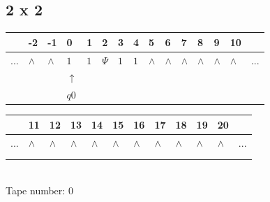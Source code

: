 \documentclass[11pt]{article}
\begin{document}
\pagebreak
\subsection{2 x 2}
\begin{table}[H]
\centering
\begin{tabular}{lllllllllllllll}
 & -2 & -1 & 0 & 1 & 2 & 3 & 4 & 5 & 6 & 7 & 8 & 9 & 10 & \\
\hline
$...$ & \multicolumn{1}{|l|}{$\wedge$} & \multicolumn{1}{|l|}{$\wedge$} & \multicolumn{1}{|l|}{$1$} & \multicolumn{1}{|l|}{$1$} & \multicolumn{1}{|l|}{$\Psi$} & \multicolumn{1}{|l|}{$1$} & \multicolumn{1}{|l|}{$1$} & \multicolumn{1}{|l|}{$\wedge$} & \multicolumn{1}{|l|}{$\wedge$} & \multicolumn{1}{|l|}{$\wedge$} & \multicolumn{1}{|l|}{$\wedge$} & \multicolumn{1}{|l|}{$\wedge$} & \multicolumn{1}{|l|}{$\wedge$} & $...$\\
\hline
&  &  & $\uparrow$ &  &  &  &  &  &  &  &  &  &  &  \\
&  &  & $ q0 $ &  &  &  &  &  &  &  &  &  &  &  \\
\end{tabular}
\begin{tabular}{llllllllllll}
 & 11 & 12 & 13 & 14 & 15 & 16 & 17 & 18 & 19 & 20 & \\
\hline
$...$ & \multicolumn{1}{|l|}{$\wedge$} & \multicolumn{1}{|l|}{$\wedge$} & \multicolumn{1}{|l|}{$\wedge$} & \multicolumn{1}{|l|}{$\wedge$} & \multicolumn{1}{|l|}{$\wedge$} & \multicolumn{1}{|l|}{$\wedge$} & \multicolumn{1}{|l|}{$\wedge$} & \multicolumn{1}{|l|}{$\wedge$} & \multicolumn{1}{|l|}{$\wedge$} & \multicolumn{1}{|l|}{$\wedge$} & $...$\\
\hline
&  &  &  &  &  &  &  &  &  &  &  \\
&  &  &  &  &  &  &  &  &  &  &  \\
\end{tabular}
\\
Tape number: 0
\noindent\makebox[\linewidth]{\hdashrule{\textwidth}{1pt}{1pt}}\end{table}
\end{document}
